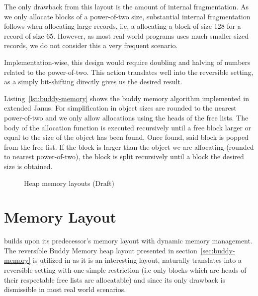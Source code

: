 The only drawback from this layout is the amount of internal fragmentation. As we only allocate blocks of a power-of-two size, substantial internal fragmentation follows when allocating large records, i.e. a allocating a block of size 128 for a record of size 65. However, as most real world programs uses much smaller sized records, we do not consider this a very frequent scenario.

Implementation-wise, this design would require doubling and halving of numbers related to the power-of-two. This action translates well into the reversible setting, as a simply bit-shifting directly gives us the desired result.



Listing~\ref{lst:buddy-memory} shows the buddy memory algorithm implemented in extended Janus. For simplification in object sizes are rounded to the nearest power-of-two and we only allow allocations using the heads of the free lists.
The body of the allocation function is executed recursively until a free block larger or equal to the size of the object has been found. Once found, said block is popped from the free list. If the block is larger than the object we are allocating (rounded to nearest power-of-two), the block is split recursively until a block the desired size is obtained.



\begin{figure}[H]
  \centering
  \caption{Heap memory layouts (Draft)}
\end{figure}


\section{\rooplpp Memory Layout}
\label{sec:rooplpp-memory-layout}
\rooplpp builds upon its predecessor's memory layout with dynamic memory management. The reversible Buddy Memory heap layout presented in section~\ref{sec:buddy-memory} is utilized in \rooplpp as it is an interesting layout, naturally translates into a reversible setting with one simple restriction (i.e only blocks which are heads of their respectable free lists are allocatable) and since its only drawback is dismissible in most real world scenarios.

